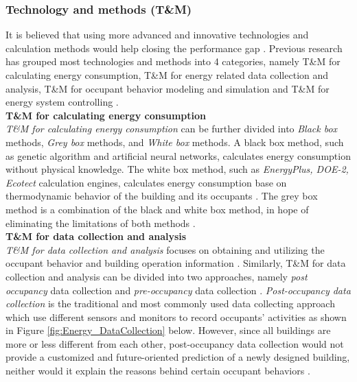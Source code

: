 \documentclass[11pt, a4paper]{article}
\theoremstyle{definition}
\begin{document}
		\subsubsection{Technology and methods (T\&M)}

			It is believed that using more advanced and innovative technologies and calculation methods would help closing the performance gap \cite{ZOU2018165}. Previous research has grouped most technologies and methods into 4 categories, namely T\&M for calculating energy consumption, T\&M for energy related data collection and analysis, T\&M for occupant behavior modeling and simulation and T\&M for energy system controlling \cite{ZOU2018165}.\\

			\textbf{T\&M for calculating energy consumption}\\
			\textit{T\&M for calculating energy consumption} can be further divided into \textit{Black box} methods, \textit{Grey box} methods, and \textit{White box} methods. A black box method, such as genetic algorithm and artificial neural networks, calculates energy consumption without physical knowledge. The white box method, such as \textit{EnergyPlus, DOE-2, Ecotect} calculation engines, calculates energy consumption base on thermodynamic behavior of the building and its occupants \cite{li2014methods,xu2007optimal}. The grey box method is a combination of the black and white box method, in hope of eliminating the limitations of both methods \cite{ZOU2018165}.\\

			\textbf{T\&M for data collection and analysis}\\
			\textit{T\&M for data collection and analysis} focuses on obtaining and utilizing the occupant behavior and building operation information \cite{ZOU2018165}. Similarly, T\&M for data collection and analysis can be divided into two approaches, namely \textit{post occupancy} data collection and \textit{pre-occupancy} data collection \cite{ZOU2018165}. \textit{Post-occupancy data collection} is the traditional and most commonly used data collecting approach which use different sensors and monitors to record occupants' activities as shown in Figure \ref{fig:Energy_DataCollection} below. However, since all buildings are more or less different from each other, post-occupancy data collection would not provide a customized and future-oriented prediction of a newly designed building, neither would it explain the reasons behind certain occupant behaviors \cite{NIU2016275}.\\
\end{document}
